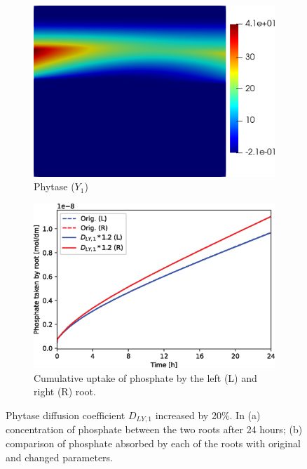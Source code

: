 \documentclass[11pt]{article}
\numberwithin{equation}{section}
\begin{document}
\begin{figure}[!htb]
\centering
\begin{subfigure}[t]{0.45\textwidth}
    \includegraphics[trim= 100 100 60 100,width=\textwidth]{Figures/Y1_DY1up20.png}
    \caption{Phytase ($Y_1$)}
    \label{fig:numexp_DLY1up1}
\end{subfigure}
\qquad
\begin{subfigure}[t]{0.45\textwidth}
    \includegraphics[width=\textwidth]{Figures/DY1up20.eps}
    \caption{Cumulative uptake of phosphate by the left (L) and right (R) root.}
    \label{fig:numexp_DLY1up2}
\end{subfigure}

\caption{Phytase diffusion coefficient $D_{LY,1}$ increased by 20\%. In (a) concentration of phosphate between the two roots after 24 hours; (b) comparison of phosphate absorbed by each of the roots with original and changed parameters.}
\label{fig:numexp_DLY1up}
\end{figure}
\end{document}
